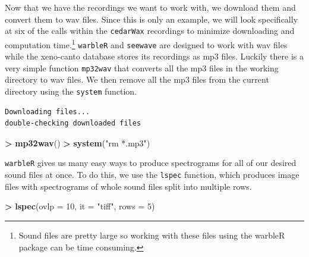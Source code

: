 \documentclass[]{krantz}
\makeatletter
\newenvironment{Shaded}{\begin{snugshade}}{\end{snugshade}}
\newcommand{\DataTypeTok}[1]{\textcolor[rgb]{0.27,0.27,0.27}{#1}}
\newcommand{\DecValTok}[1]{\textcolor[rgb]{0.06,0.06,0.06}{#1}}
\newcommand{\KeywordTok}[1]{\textcolor[rgb]{0.27,0.27,0.27}{\textbf{#1}}}
\newcommand{\NormalTok}[1]{#1}
\newcommand{\OperatorTok}[1]{\textcolor[rgb]{0.43,0.43,0.43}{\textbf{#1}}}
\newcommand{\StringTok}[1]{\textcolor[rgb]{0.5,0.5,0.5}{#1}}
\newenvironment{kframe}{%
\medskip{}
\setlength{\fboxsep}{.8em}
 \def\at@end@of@kframe{}%
 \ifinner\ifhmode%
  \def\at@end@of@kframe{\end{minipage}}%
  \begin{minipage}{\columnwidth}%
 \fi\fi%
 \def\FrameCommand##1{\hskip\@totalleftmargin \hskip-\fboxsep
 \colorbox{shadecolor}{##1}\hskip-\fboxsep
     \hskip-\linewidth \hskip-\@totalleftmargin \hskip\columnwidth}%
 \MakeFramed {\advance\hsize-\width
   \@totalleftmargin\z@ \linewidth\hsize
   \@setminipage}}%
 {\par\unskip\endMakeFramed%
 \at@end@of@kframe}
\renewenvironment{Shaded}{\begin{kframe}}{\end{kframe}}
\makeatother
\begin{document}
Now that we have the recordings we want to work with, we download them and convert them to wav files. Since this is only an example, we will look specifically at six of the calls within the \texttt{cedarWax} recordings to minimize downloading and computation time.\footnote{Sound files are pretty large so working with these files using the warbleR package can be time consuming.} \texttt{warbleR} and \texttt{seewave} are designed to work with wav files while the xeno-canto database stores its recordings as mp3 files. Luckily there is a very simple function \texttt{mp32wav} that converts all the mp3 files in the working directory to wav files. We then remove all the mp3 files from the current directory using the \texttt{system} function.

\begin{Shaded}
\end{Shaded}

\begin{verbatim}
Downloading files...
double-checking downloaded files
\end{verbatim}

\begin{Shaded}
\begin{Highlighting}[]
\OperatorTok{>}\StringTok{ }\KeywordTok{mp32wav}\NormalTok{()}
\OperatorTok{>}\StringTok{ }\KeywordTok{system}\NormalTok{(}\StringTok{"rm *.mp3"}\NormalTok{)}
\end{Highlighting}
\end{Shaded}

\texttt{warbleR} gives us many easy ways to produce spectrograms for all of our desired sound files at once. To do this, we use the \texttt{lspec} function, which produces image files with spectrograms of whole sound files split into multiple rows.

\begin{Shaded}
\begin{Highlighting}[]
\OperatorTok{>}\StringTok{ }\KeywordTok{lspec}\NormalTok{(}\DataTypeTok{ovlp =} \DecValTok{10}\NormalTok{, }\DataTypeTok{it =} \StringTok{"tiff"}\NormalTok{, }\DataTypeTok{rows =} \DecValTok{5}\NormalTok{)}
\end{Highlighting}
\end{Shaded}
\end{document}
